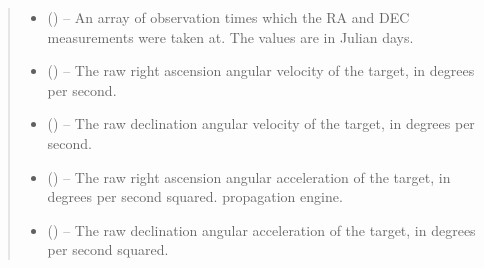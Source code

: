 \documentclass[letterpaper,11pt,english]{sphinxmanual}
\begin{document}
\begin{savenotes}
\begin{fulllineitems}
\begin{savenotes}
\begin{fulllineitems}
\begin{quote}
\begin{description}
\begin{itemize}
\item {} 
\sphinxAtStartPar
{} () – An array of observation times which the RA and DEC measurements
were taken at. The values are in Julian days.

\end{itemize}

\sphinxAtStartPar
\begin{itemize}
\item {} 
\sphinxAtStartPar
{} () – The raw right ascension angular velocity of the target, in degrees
per second.

\item {} 
\sphinxAtStartPar
{} () – The raw declination angular velocity of the target, in degrees per
second.

\item {} 
\sphinxAtStartPar
{} () – The raw right ascension angular acceleration of the target, in
degrees per second squared.
propagation engine.

\item {} 
\sphinxAtStartPar
{} () – The raw declination angular acceleration of the target, in
degrees per second squared.

\end{itemize}


\end{description}\end{quote}

\end{fulllineitems}\end{savenotes}



\end{fulllineitems}
\end{savenotes}
\end{document}
